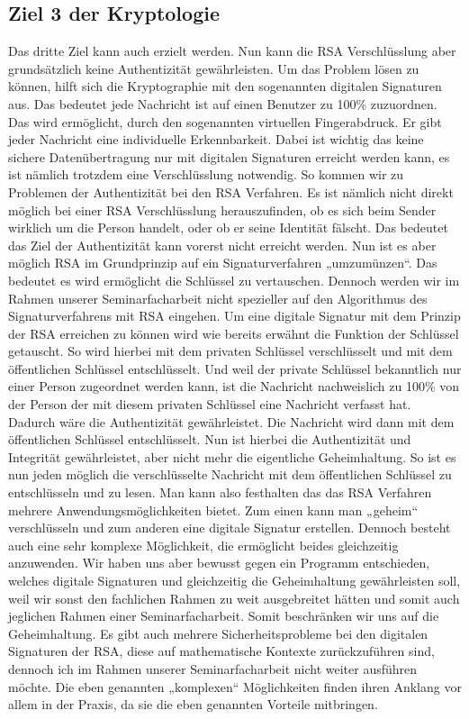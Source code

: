 \subsection{Ziel 3 der Kryptologie}
Das dritte Ziel kann auch erzielt werden. Nun kann die RSA Verschlüsslung aber grundsätzlich keine Authentizität gewährleisten. Um das Problem lösen zu können, hilft sich die Kryptographie mit den sogenannten digitalen Signaturen aus. Das bedeutet jede Nachricht ist auf einen Benutzer zu 100\% zuzuordnen. Das wird ermöglicht, durch den sogenannten virtuellen Fingerabdruck. Er gibt jeder Nachricht eine individuelle Erkennbarkeit. Dabei ist wichtig das keine sichere Datenübertragung nur mit digitalen Signaturen erreicht werden kann, es ist nämlich trotzdem eine Verschlüsslung notwendig. So kommen wir zu Problemen der Authentizität bei den RSA Verfahren. Es ist nämlich nicht direkt möglich bei einer RSA Verschlüsslung herauszufinden, ob es sich beim Sender wirklich um die Person handelt, oder ob er seine Identität fälscht. Das bedeutet das Ziel der Authentizität kann vorerst nicht erreicht werden. Nun ist es aber möglich RSA im Grundprinzip auf ein Signaturverfahren „umzumünzen“. Das bedeutet es wird ermöglicht die Schlüssel zu vertauschen. Dennoch werden wir im Rahmen unserer Seminarfacharbeit nicht spezieller auf den Algorithmus des Signaturverfahrens mit RSA eingehen. Um eine digitale Signatur mit dem Prinzip der RSA erreichen zu können wird wie bereits erwähnt die Funktion der Schlüssel getauscht. So wird hierbei mit dem privaten Schlüssel verschlüsselt und mit dem öffentlichen Schlüssel entschlüsselt. Und weil der private Schlüssel bekanntlich nur einer Person zugeordnet werden kann, ist die Nachricht nachweislich zu 100\% von der Person der mit diesem privaten Schlüssel eine Nachricht verfasst hat. Dadurch wäre die Authentizität gewährleistet. Die Nachricht wird dann mit dem öffentlichen Schlüssel entschlüsselt. Nun ist hierbei die Authentizität und Integrität gewährleistet, aber nicht mehr die eigentliche Geheimhaltung. So ist es nun jeden möglich die verschlüsselte Nachricht mit dem öffentlichen Schlüssel zu entschlüsseln und zu lesen. Man kann also festhalten das das RSA Verfahren mehrere Anwendungsmöglichkeiten bietet. Zum einen kann man „geheim“ verschlüsseln und zum anderen eine digitale Signatur erstellen. Dennoch besteht auch eine sehr komplexe Möglichkeit, die ermöglicht beides gleichzeitig anzuwenden. Wir haben uns aber bewusst gegen ein Programm entschieden, welches digitale Signaturen und gleichzeitig die Geheimhaltung gewährleisten soll, weil wir sonst den fachlichen Rahmen zu weit ausgebreitet hätten und somit auch jeglichen Rahmen einer Seminarfacharbeit. Somit beschränken wir uns auf die Geheimhaltung. Es gibt auch mehrere Sicherheitsprobleme bei den digitalen Signaturen der RSA, diese auf mathematische Kontexte zurückzuführen sind, dennoch ich im Rahmen unserer Seminarfacharbeit nicht weiter ausführen möchte. Die eben genannten „komplexen“ Möglichkeiten finden ihren Anklang vor allem in der Praxis, da sie die eben genannten Vorteile mitbringen.

